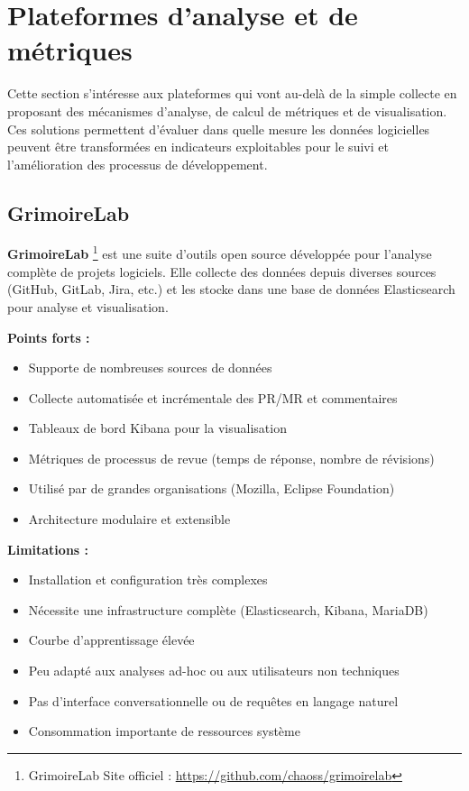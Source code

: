\section{Plateformes d'analyse et de métriques}
Cette section s’intéresse aux plateformes qui vont au-delà de la simple collecte en proposant des mécanismes d’analyse, de calcul de métriques et de visualisation. Ces solutions permettent d’évaluer dans quelle mesure les données logicielles peuvent être transformées en indicateurs exploitables pour le suivi et l’amélioration des processus de développement.

\subsection{GrimoireLab}

\textbf{GrimoireLab} \footnote{GrimoireLab Site officiel : \url{https://github.com/chaoss/grimoirelab}} est une suite d'outils open source développée pour l'analyse complète de projets logiciels. Elle collecte des données depuis diverses sources (GitHub, GitLab, Jira, etc.) et les stocke dans une base de données Elasticsearch pour analyse et visualisation.

\textbf{Points forts :}
\begin{itemize}
    \item Supporte de nombreuses sources de données
    \item Collecte automatisée et incrémentale des PR/MR et commentaires
    \item Tableaux de bord Kibana pour la visualisation
    \item Métriques de processus de revue (temps de réponse, nombre de révisions)
    \item Utilisé par de grandes organisations (Mozilla, Eclipse Foundation)
    \item Architecture modulaire et extensible
\end{itemize}

\textbf{Limitations :}
\begin{itemize}
    \item Installation et configuration très complexes
    \item Nécessite une infrastructure complète (Elasticsearch, Kibana, MariaDB)
    \item Courbe d'apprentissage élevée
    \item Peu adapté aux analyses ad-hoc ou aux utilisateurs non techniques
    \item Pas d'interface conversationnelle ou de requêtes en langage naturel
    \item Consommation importante de ressources système
\end{itemize}


